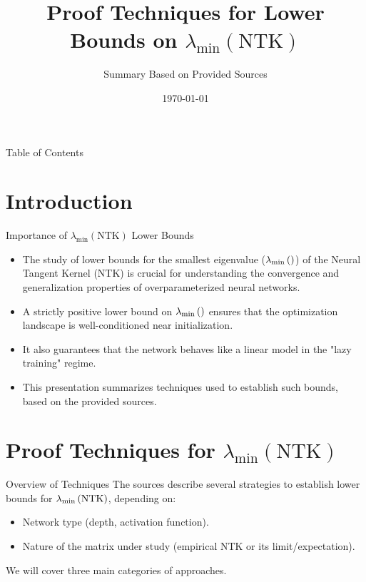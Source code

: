\documentclass{beamer}
\title{Proof Techniques for Lower Bounds on $\lambda_{\min}(\text{NTK})$}
\author{Summary Based on Provided Sources}
\date{\today}
\newcommand{\evmin}[1]{\lambda_{\rm min}\left(#1\right)} %
\begin{document}
\begin{frame}
  \titlepage
\end{frame}

\begin{frame}{Table of Contents}
  \tableofcontents
\end{frame}

\section{Introduction}
\begin{frame}{Importance of $\lambda_{\min}(\text{NTK})$ Lower Bounds}
  \begin{itemize}[<+->]
    \item The study of lower bounds for the smallest eigenvalue ($\evmin{}$) of the Neural Tangent Kernel (NTK) is crucial for understanding the convergence and generalization properties of overparameterized neural networks.
    \item A strictly positive lower bound on $\evmin{}$ ensures that the optimization landscape is well-conditioned near initialization.
    \item It also guarantees that the network behaves like a linear model in the "lazy training" regime.
    \item This presentation summarizes techniques used to establish such bounds, based on the provided sources.
  \end{itemize}
\end{frame}

\section{Proof Techniques for $\lambda_{\min}(\text{NTK})$}

\begin{frame}{Overview of Techniques}
  The sources describe several strategies to establish lower bounds for $\evmin{\text{NTK}}$, depending on:
  \begin{itemize}[<+->]
    \item Network type (depth, activation function).
    \item Nature of the matrix under study (empirical NTK or its limit/expectation).
  \end{itemize}
  We will cover three main categories of approaches.
\end{frame}
\end{document}
